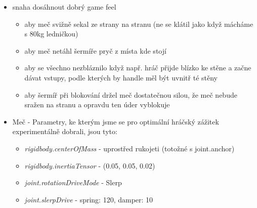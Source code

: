 \begin{itemize}
  \item snaha dosáhnout dobrý game feel
    \begin{itemize}
      \item aby meč svižně sekal ze strany na stranu (ne se klátil jako když mácháme s 80kg ledničkou)
      \item aby meč netáhl šermíře pryč z místa kde stojí
      \item aby se všechno nezbláznilo když např. hráč přijde blízko ke stěne a začne dávat vstupy, podle kterých by handle měl být uvnitř té stěny
      \item aby šermíř při blokování držel meč dostatečnou silou, že meč nebude sražen na stranu a opravdu ten úder vyblokuje 
    \end{itemize}

  \item Meč - Parametry, ke kterým jsme se pro optimální hráčský zážitek experimentálně dobrali, jsou tyto: 
    \begin{itemize}
      \item \textit{rigidbody.centerOfMass} - uprostřed rukojeti (totožné s joint.anchor)
      \item \textit{rigidbody.inertiaTensor} - (0.05, 0.05, 0.02)
      \item \textit{joint.rotationDriveMode} - Slerp
      \item \textit{joint.slerpDrive} - spring: 120, damper: 10
    \end{itemize}
    

\end{itemize}
